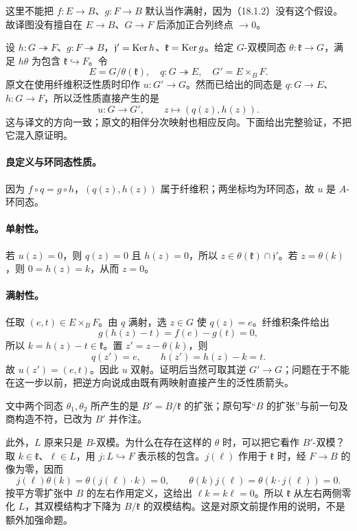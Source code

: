 这里不能把 $f:E\to B$、$g:F\to B$ 默认当作满射，因为（18.1.2）没有这个假设。故译图没有擅自在 $E\to B$、$G\to F$ 后添加正合列终点 $\to0$。

设 $h:G\twoheadrightarrow F$、$g:F\twoheadrightarrow B$，$\mathfrak j'=\operatorname{Ker} h$、$\mathfrak k=\operatorname{Ker} g$。给定 $G$-双模同态 $\theta:\mathfrak k\to G$，满足 $h\theta$ 为包含 $\mathfrak k\hookrightarrow F$。令
\[
 E=G/\theta(\mathfrak k),\quad q:G\twoheadrightarrow E,\quad
 G'=E\times_BF.
\]
原文在使用纤维积泛性质时印作 $u:G'\to G$。然而已给出的同态是 $q:G\to E$、$h:G\to F$，所以泛性质直接产生的是
\[
 u:G\longrightarrow G',\qquad z\longmapsto(q(z),h(z)).
\]
这与译文的方向一致；原文的相伴分次映射也相应反向。下面给出完整验证，不把它混入原证明。

\paragraph{良定义与环同态性质。}
因为 $f\circ q=g\circ h$，$(q(z),h(z))$ 属于纤维积；两坐标均为环同态，故 $u$ 是 $A$-环同态。

\paragraph{单射性。}
若 $u(z)=0$，则 $q(z)=0$ 且 $h(z)=0$，所以 $z\in\theta(\mathfrak k)\cap\mathfrak j'$。若 $z=\theta(k)$，则 $0=h(z)=k$，从而 $z=0$。

\paragraph{满射性。}
任取 $(e,t)\in E\times_BF$。由 $q$ 满射，选 $z\in G$ 使 $q(z)=e$。纤维积条件给出
\[
 g(h(z)-t)=f(e)-g(t)=0,
\]
所以 $k=h(z)-t\in\mathfrak k$。置 $z'=z-\theta(k)$，则
\[
 q(z')=e,\qquad h(z')=h(z)-k=t.
\]
故 $u(z')=(e,t)$。因此 $u$ 双射。证明后当然可取其逆 $G'\to G$；问题在于不能在这一步以前，把逆方向说成由既有两映射直接产生的泛性质箭头。

文中两个同态 $\theta_1,\theta_2$ 所产生的是 $B'=B/\mathfrak k$ 的扩张；原句写“$B$ 的扩张”与前一句及商构造不符，已改为 $B'$ 并作注。

此外，$L$ 原来只是 $B$-双模。为什么在存在这样的 $\theta$ 时，可以把它看作 $B'$-双模？取 $k\in\mathfrak k$、$\ell\in L$，用 $j:L\hookrightarrow F$ 表示核的包含。$j(\ell)$ 作用于 $\mathfrak k$ 时，经 $F\to B$ 的像为零，因而
\[
 j(\ell)\theta(k)=\theta(j(\ell)\cdot k)=0,
 \qquad
 \theta(k)j(\ell)=\theta(k\cdot j(\ell))=0.
\]
按平方零扩张中 $B$ 的左右作用定义，这给出 $\ell k=k\ell=0$。所以 $\mathfrak k$ 从左右两侧零化 $L$，其双模结构才下降为 $B/\mathfrak k$ 的双模结构。这是对原文前提作用的说明，不是额外加强命题。

